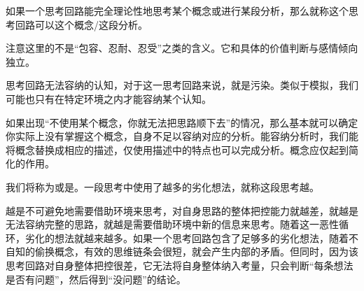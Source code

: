 如果一个思考回路能完全理论性地思考某个概念或进行某段分析，那么就称这个思考回路可以这个概念/这段分析。
\begin{explain}
注意这里的不是“包容、忍耐、忍受”之类的含义。它和具体的价值判断与感情倾向独立。

思考回路无法容纳的认知，对于这一思考回路来说，就是污染。类似于模拟，我们可能也只有在特定环境之内才能容纳某个认知。

如果出现“不使用某个概念，你就无法把思路顺下去”的情况，那么基本就可以确定你实际上没有掌握这个概念，自身不足以容纳对应的分析。能容纳分析时，我们能将概念替换成相应的描述，仅使用描述中的特点也可以完成分析。概念应仅起到简化的作用。
\end{explain}
我们将称为或是。一段思考中使用了越多的劣化想法，就称这段思考越。
\begin{explain}
越是不可避免地需要借助环境来思考，对自身思路的整体把控能力就越差，就越是无法容纳完整的思路，就越是需要借助环境中新的信息来思考。随着这一恶性循环，劣化的想法就越来越多。如果一个思考回路包含了足够多的劣化想法，随着不自知的偷换概念，有效的思维链条会很短，就会产生内部的矛盾。但同时，因为该思考回路对自身整体把控很差，它无法将自身整体纳入考量，只会判断“每条想法是否有问题”，然后得到“没问题”的结论。
\end{explain}

